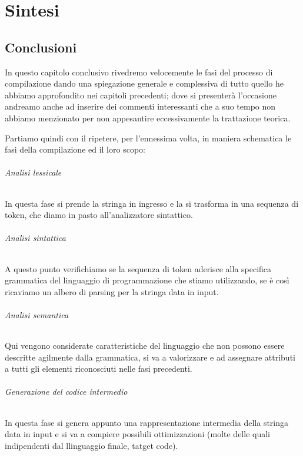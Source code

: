 \documentclass[class=book, crop=false, oneside, 12pt]{standalone}
\begin{document}
\part{Sintesi}
\chapter{Conclusioni}
In questo capitolo conclusivo rivedremo velocemente le fasi del  processo di compilazione dando una spiegazione generale e complessiva di tutto quello he abbiamo approfondito nei capitoli precedenti; dove si presenterà l'occasione andreamo anche ad inserire dei commenti interessanti che a suo tempo non abbiamo menzionato per non appesantire eccessivamente la trattazione teorica.

Partiamo quindi con il ripetere, per l'ennessima volta, in maniera schematica le fasi della compilazione ed il loro scopo:
\paragraph{Analisi lessicale} In questa fase si prende la stringa in ingresso e la si trasforma in una sequenza di token, che diamo in pasto all'analizzatore sintattico.

\paragraph{Analisi sintattica} A questo punto verifichiamo se la sequenza di token aderisce alla specifica grammatica del linguaggio di programmazione che stiamo utilizzando, se è così ricaviamo un albero di parsing per la stringa data in input. 

\paragraph{Analisi semantica} Qui vengono considerate caratteristiche del linguaggio che non possono essere descritte agilmente dalla grammatica, si va a valorizzare e ad assegnare attributi a tutti gli elementi riconosciuti nelle fasi precedenti.
	
\paragraph{Generazione del codice intermedio} In questa fase si genera appunto una rappresentazione intermedia della stringa data in input e si va a compiere possibili ottimizzazioni (molte delle quali indipendenti dal llinguaggio finale, tatget code).
\end{document}
